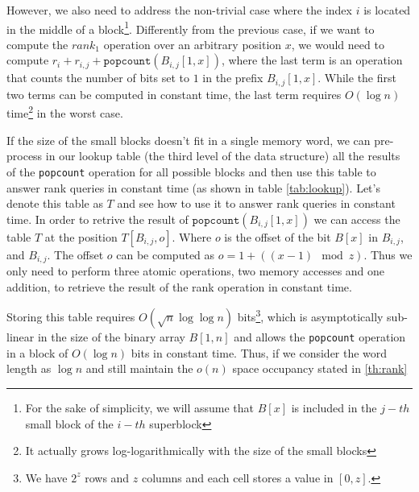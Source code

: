 However, we also need to address the non-trivial case where the index $i$ is located in the middle of a block\footnote{For the sake of simplicity, we will assume that $B[x]$ is included in the $j-th$ small block of the $i-th$ superblock}. Differently from the previous case, if we want to compute the $rank_1$ operation over an arbitrary position $x$, we would need to compute $r_i + r_{i,j} + \texttt{popcount}(B_{i,j}[1,x])$, where the last term is an operation that counts the number of bits set to $1$ in the prefix $B_{i,j}[1,x]$. While the first two terms can be computed in constant time, the last term requires $O(\log n)$ time\footnote{It actually grows log-logarithmically with the size of the small blocks} in the worst case.


If the size of the small blocks doesn't fit in a single memory word, we can pre-process in our lookup table (the third level of the data structure) all the results of the \texttt{popcount} operation for all possible blocks and then use this table to answer rank queries in constant time (as shown in table \ref{tab:lookup}). Let's denote this table as $T$ and see how to use it to answer rank queries in constant time. In order to retrive the result of $\texttt{popcount}(B_{i,j}[1,x])$ we can access the table $T$ at the position $T[B_{i,j}, o]$. Where $o$ is the offset of the bit $B[x]$ in $B_{i,j}$, and $B_{i,j}$. The offset $o$ can be computed as $o = 1 + ((x-1) \mod z)$. Thus we only need to perform three atomic operations, two memory accesses and one addition, to retrieve the result of the rank operation in constant time.

Storing this table requires $O(\sqrt{n} \log \log n)$ bits\footnote{We have $2^z$ rows and $z$ columns and each cell stores a value in $[0, z]$.}, which is asymptotically sub-linear in the size of the binary array $B[1, n]$ and allows the \texttt{popcount} operation in a block of $O(\log n)$ bits in constant time. Thus, if we consider the word length as $\log n$ and still maintain the $o(n)$ space occupancy stated in \ref{th:rank}


